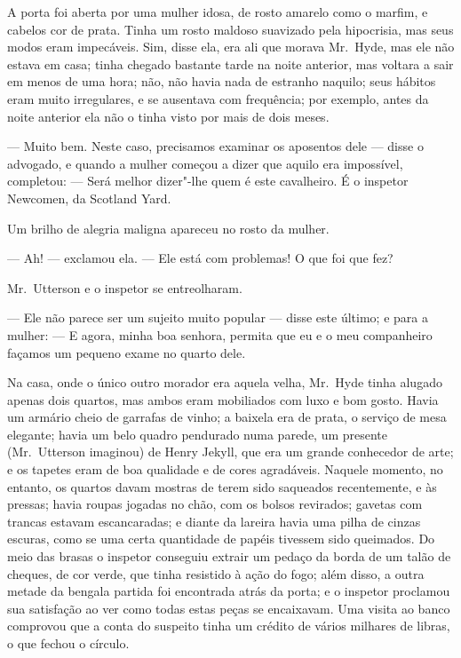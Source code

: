 A porta foi aberta por uma mulher idosa, de rosto amarelo como o marfim,
e cabelos cor de prata.  Tinha um rosto maldoso suavizado pela
hipocrisia, mas seus modos eram impecáveis.  Sim, disse ela, era ali
que morava Mr.~Hyde, mas ele não estava em casa; tinha chegado bastante
tarde na noite anterior, mas voltara a sair em menos de uma hora; não,
não havia nada de estranho naquilo; seus hábitos eram muito
irregulares, e se ausentava com frequência; por exemplo, antes da noite
anterior ela não o tinha visto por mais de dois meses.

--- Muito bem.  Neste caso, precisamos examinar os aposentos dele ---
disse o advogado, e quando a mulher começou a dizer que aquilo era
impossível, completou: --- Será melhor dizer"-lhe quem é este cavalheiro. 
É o inspetor Newcomen, da Scotland Yard.

Um brilho de alegria maligna apareceu no rosto da mulher.

--- Ah! --- exclamou ela. --- Ele está com problemas!  O que foi que fez?

Mr.~Utterson e o inspetor se entreolharam.

--- Ele não parece ser um sujeito muito popular --- disse este último; e
para a mulher: --- E agora, minha boa senhora, permita que eu e o meu
companheiro façamos um pequeno exame no quarto dele.

Na casa, onde o único outro morador era aquela velha, Mr.~Hyde tinha
alugado apenas dois quartos, mas ambos eram mobiliados com luxo e bom
gosto.  Havia um armário cheio de garrafas de vinho; a baixela era de
prata, o serviço de mesa elegante; havia um belo quadro pendurado numa
parede, um presente (Mr.~Utterson imaginou) de Henry Jekyll, que era um
grande conhecedor de arte; e os tapetes eram de boa qualidade e de
cores agradáveis. Naquele momento, no entanto, os quartos davam mostras
de terem sido saqueados recentemente, e às pressas; havia roupas
jogadas no chão, com os bolsos revirados; gavetas com trancas estavam
escancaradas; e diante da lareira havia uma pilha de cinzas escuras,
como se uma certa quantidade de papéis tivessem sido queimados.  Do
meio das brasas o inspetor conseguiu extrair um pedaço da borda de um
talão de cheques, de cor verde, que tinha resistido à ação do fogo;
além disso, a outra metade da bengala partida foi encontrada atrás da
porta; e o inspetor proclamou sua satisfação ao ver como todas estas
peças se encaixavam.  Uma visita ao banco comprovou que a conta do
suspeito tinha um crédito de vários milhares de libras, o que fechou o
círculo.

